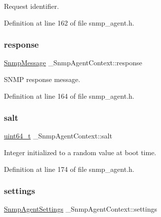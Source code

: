 Request identifier. 



Definition at line 162 of file snmp\+\_\+agent.\+h.

\mbox{\label{struct__SnmpAgentContext_a6a542552834e9f5aeb8095c4fe6520f0}} 
\subsubsection{\texorpdfstring{response}{response}}
{\footnotesize\ttfamily \hyperlink{structSnmpMessage}{Snmp\+Message} \+\_\+\+Snmp\+Agent\+Context\+::response}



S\+N\+MP response message. 



Definition at line 164 of file snmp\+\_\+agent.\+h.

\mbox{\label{struct__SnmpAgentContext_aafefb8fd2674bba56778993656136b0f}} 
\subsubsection{\texorpdfstring{salt}{salt}}
{\footnotesize\ttfamily \hyperlink{stdint_8h_aec6fcb673ff035718c238c8c9d544c47}{uint64\+\_\+t} \+\_\+\+Snmp\+Agent\+Context\+::salt}



Integer initialized to a random value at boot time. 



Definition at line 174 of file snmp\+\_\+agent.\+h.

\mbox{\label{struct__SnmpAgentContext_a5f6fe35e052673ddcedb1bf8c4775631}} 
\subsubsection{\texorpdfstring{settings}{settings}}
{\footnotesize\ttfamily \hyperlink{structSnmpAgentSettings}{Snmp\+Agent\+Settings} \+\_\+\+Snmp\+Agent\+Context\+::settings}



